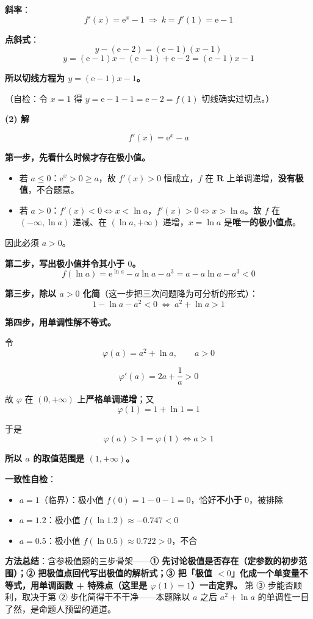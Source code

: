 \textbf{斜率}：
\[f'(x)=\mathrm e^{x}-1\ \Longrightarrow\ k=f'(1)=\mathrm e-1\]

\textbf{点斜式}：
\[y-(\mathrm e-2)=(\mathrm e-1)(x-1)\]
\[y=(\mathrm e-1)x-(\mathrm e-1)+\mathrm e-2=(\mathrm e-1)x-1\]

\textbf{所以切线方程为 $y=(\mathrm e-1)x-1$。}

（自检：令 $x=1$ 得 $y=\mathrm e-1-1=\mathrm e-2=f(1)$  切线确实过切点。）

\par\medskip

\textbf{(2) 解}

\[f'(x)=\mathrm e^{x}-a\]

\textbf{第一步，先看什么时候才存在极小值。}

\begin{itemize}
\item 若 $a\le0$：$\mathrm e^{x}>0\ge a$，故 $f'(x)>0$ 恒成立，$f$ 在 $\mathbf R$ 上单调递增，\textbf{没有极值}，不合题意。
\item 若 $a>0$：$f'(x)<0\iff x<\ln a$，$f'(x)>0\iff x>\ln a$。故 $f$ 在 $(-\infty,\ln a)$ 递减、在 $(\ln a,+\infty)$ 递增，$x=\ln a$ 是\textbf{唯一的极小值点}。
\end{itemize}

因此必须 $a>0$。

\textbf{第二步，写出极小值并令其小于 $0$。}
\[f(\ln a)=\mathrm e^{\ln a}-a\ln a-a^{3}=a-a\ln a-a^{3}<0\]

\textbf{第三步，除以 $a>0$ 化简}（这一步把三次问题降为可分析的形式）：
\[1-\ln a-a^{2}<0\ \Longleftrightarrow\ a^{2}+\ln a>1\]

\textbf{第四步，用单调性解不等式。}

令
\[\varphi(a)=a^{2}+\ln a,\qquad a>0\]

\[\varphi'(a)=2a+\frac1a>0\]

故 $\varphi$ 在 $(0,+\infty)$ 上\textbf{严格单调递增}；又
\[\varphi(1)=1+\ln1=1\]

于是
\[\varphi(a)>1=\varphi(1)\iff a>1\]

\textbf{所以 $a$ 的取值范围是 $(1,+\infty)$。}

\begin{gktip}
\textbf{一致性自检}：
\begin{itemize}
\item $a=1$（临界）：极小值 $f(0)=1-0-1=0$，恰好\textbf{不小于} $0$，被排除 
\item $a=1.2$：极小值 $f(\ln1.2)\approx-0.747<0$ 
\item $a=0.5$：极小值 $f(\ln0.5)\approx0.722>0$，不合 
\end{itemize}

\textbf{方法总结}：含参极值题的三步骨架——\textbf{① 先讨论极值是否存在（定参数的初步范围）；② 把极值点回代写出极值的解析式；③ 把「极值 $<0$」化成一个单变量不等式，用单调函数 + 特殊点（这里是 $\varphi(1)=1$）一击定界。} 第 ③ 步能否顺利，取决于第 ② 步化简得干不干净——本题除以 $a$ 之后 $a^{2}+\ln a$ 的单调性一目了然，是命题人预留的通道。
\end{gktip}

